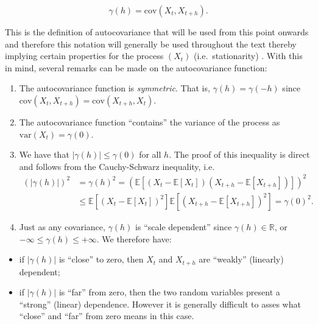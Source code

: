 \documentclass[]{book}
\providecommand{\tightlist}{%
  \setlength{\itemsep}{0pt}\setlength{\parskip}{0pt}}
\theoremstyle{definition}
\theoremstyle{definition}
\theoremstyle{definition}
\theoremstyle{remark}
\begin{document}
\[\gamma \left( {h} \right) = \text{cov} \left( X_t , X_{t+h} \right). \]

This is the definition of autocovariance that will be used from this
point onwards and therefore this notation will generally be used
throughout the text thereby implying certain properties for the process
\((X_t)\) (i.e.~stationarity) . With this in mind, several remarks can
be made on the autocovariance function:

\begin{enumerate}
\def\labelenumi{\arabic{enumi}.}
\tightlist
\item
  The autocovariance function is \emph{symmetric}. That is,
  \({\gamma}\left( {h} \right) = {\gamma}\left( -h \right)\) since
  \(\text{cov} \left( {{X_t},{X_{t+h}}} \right) = \text{cov} \left( X_{t+h},X_{t} \right)\).
\item
  The autocovariance function ``contains'' the variance of the process
  as \(\text{var} \left( X_{t} \right) = {\gamma}\left( 0 \right)\).
\item
  We have that \(|\gamma(h)| \leq \gamma(0)\) for all \(h\). The proof
  of this inequality is direct and follows from the Cauchy-Schwarz
  inequality, i.e. \[ \begin{aligned}
    \left(|\gamma(h)| \right)^2 &= \gamma(h)^2 = \left(\mathbb{E}\left[\left(X_t - \mathbb{E}[X_t] \right)\left(X_{t+h} - \mathbb{E}[X_{t+h}] \right)\right]\right)^2\\
    &\leq \mathbb{E}\left[\left(X_t - \mathbb{E}[X_t] \right)^2 \right] \mathbb{E}\left[\left(X_{t+h} - \mathbb{E}[X_{t+h}] \right)^2 \right] =  \gamma(0)^2. 
    \end{aligned}
    \]
\item
  Just as any covariance, \({\gamma}\left( {h} \right)\) is ``scale
  dependent'' since \({\gamma}\left( {h} \right) \in \mathbb{R}\), or
  \(-\infty \le {\gamma}\left( {h} \right) \le +\infty\). We therefore
  have:
\end{enumerate}

\begin{itemize}
\tightlist
\item
  if \(\left| {\gamma}\left( {h} \right) \right|\) is ``close'' to zero,
  then \(X_t\) and \(X_{t+h}\) are ``weakly'' (linearly) dependent;
\item
  if \(\left| {\gamma}\left( {h} \right) \right|\) is ``far'' from zero,
  then the two random variables present a ``strong'' (linear)
  dependence. However it is generally difficult to asses what ``close''
  and ``far'' from zero means in this case.
\end{itemize}
\end{document}
